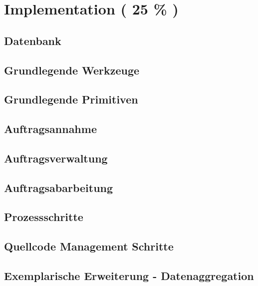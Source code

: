 \chapter{Implementation ( 25 \% ) }
\section{Datenbank}
\section{Grundlegende Werkzeuge}
\section{Grundlegende Primitiven}
\section{Auftragsannahme}
\section{Auftragsverwaltung}
\section{Auftragsabarbeitung}
\section{Prozessschritte}
\section{Quellcode Management Schritte}
\section{Exemplarische Erweiterung - Datenaggregation}
